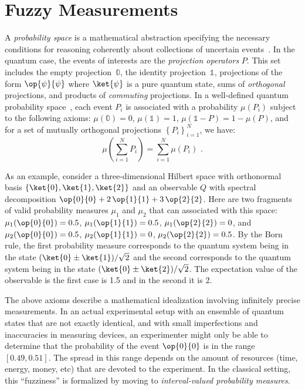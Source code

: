 \documentclass[english,reprint, aps, prl,superscriptaddress, showpacs,
showkeys, longbibliography, amsmath, amssymb]{revtex4-1}
\theoremstyle{plain}
\theoremstyle{definition}
\newcommand{\proj}[1]{\op{#1}{#1}}
\begin{document}
\section{Fuzzy Measurements}
 
A \emph{probability space} is a mathematical abstraction specifying
the necessary conditions for reasoning coherently about collections of
uncertain events~\cite{Kolmogorov1950}.  In the quantum case, the
events of interests are the \emph{projection operators} $P$. This set
includes the empty projection~$\mathbb{0}$, the identity
projection~$\mathbb{1}$, projections of the form $\proj{\psi}$ where
$\ket{\psi}$ is a pure quantum state, sums of \emph{orthogonal}
projections, and products of \emph{commuting} projections. In a
well-defined quantum probability
space~\cite{10.2307/2308516,gleason1957,Redhead1987-REDINA,Maassen2010},
each event $P_i$ is associated with a probability $\mu(P_i)$ subject
to the following axioms: $\mu(\mathbb{0})=0$, $\mu(\mathbb{1})=1$,
$\mu\left(\mathbb{1}-P\right)=1-\mu\left(P\right)$, and for a set of
mutually orthogonal projections $\left\{ P_{i}\right\} _{i=1}^{N}$, we
have:
\begin{equation}
\mu\left(\sum_{i=1}^{N}P_{i}\right)=
\sum_{i=1}^{N}\mu\left(P_{i}\right)
\textrm{ .}\label{eq:QuantumProbability-Addition}
\end{equation}

As an example, consider a three-dimensional Hilbert space with
orthonormal basis $\{\ket{0},\ket{1},\ket{2}\}$ and an observable $Q$
with spectral decomposition $\proj{0} + 2\,\proj{1} +
3\,\proj{2}$. Here are two fragments of valid probability measures
$\mu_1$ and $\mu_2$ that can associated with this space:
$\mu_1(\proj{0}) = 0.5$, $\mu_1(\proj{1}) = 0.5$,
$\mu_1(\proj{2}) = 0$, and $\mu_2(\proj{0}) = 0.5$,
$\mu_2(\proj{1}) = 0$, $\mu_2(\proj{2}) = 0.5$. By the Born rule,
the first probability measure corresponds to the quantum system being
in the state $(\ket{0}\pm\ket{1})/\sqrt{2}$ and the second corresponds
to the quantum system being in the state
$(\ket{0}\pm\ket{2})/\sqrt{2}$. The expectation value of the observable
is the first case is 1.5 and in the second it is 2.

The above axioms describe a mathematical idealization involving
infinitely precise measurements. In an actual experimental setup with
an ensemble of quantum states that are not exactly identical, and with
small imperfections and inaccuracies in measuring devices, an
experimenter might only be able to determine that the probability of
the event $\proj{0}$ is in the range $[0.49,0.51]$. The spread in this
range depends on the amount of resources (time, energy, money, etc)
that are devoted to the experiment. In the classical setting, this
``fuzziness'' is formalized by moving to \emph{interval-valued
  probability measures}.
\end{document}
